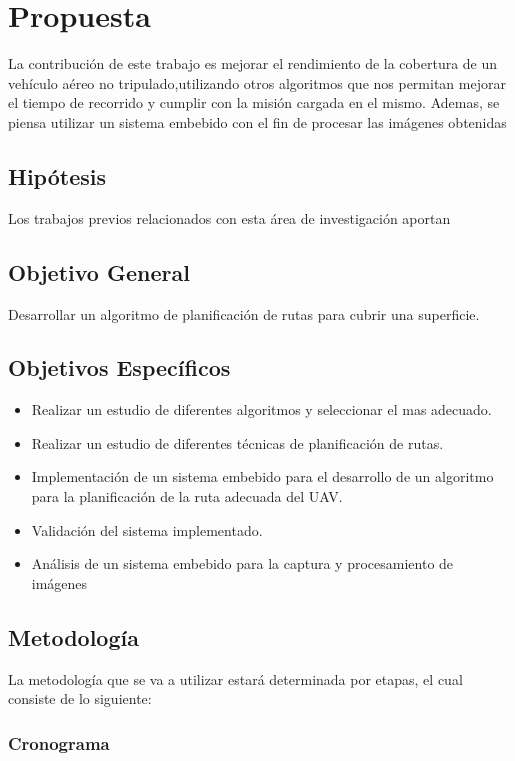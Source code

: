 \documentclass[]{report}
\begin{document}
\chapter{Propuesta}
La contribución de este trabajo es mejorar el rendimiento de la cobertura de un vehículo aéreo no tripulado,utilizando otros algoritmos que nos permitan mejorar el tiempo de recorrido y cumplir con la misión cargada en el mismo.
Ademas, se piensa utilizar un sistema embebido con el fin de procesar las imágenes obtenidas 



\section{Hipótesis}
Los trabajos previos relacionados con esta área de investigación aportan

\section{Objetivo General}
Desarrollar un algoritmo de planificación de rutas para cubrir una superficie.
\section{Objetivos Específicos}
\begin{itemize}
\item Realizar un estudio de diferentes algoritmos y seleccionar el mas adecuado.
\item Realizar un estudio de diferentes técnicas de planificación de rutas.
\item Implementación de un sistema embebido para el desarrollo de un algoritmo para la planificación de la ruta adecuada del UAV.
\item Validación del sistema implementado.
\item Análisis de un sistema embebido para la captura y procesamiento de imágenes
\end{itemize}
\section{Metodología}
La metodología que se va a utilizar estará determinada por etapas, el cual consiste de lo siguiente:


\subsection{Cronograma}
\end{document}
